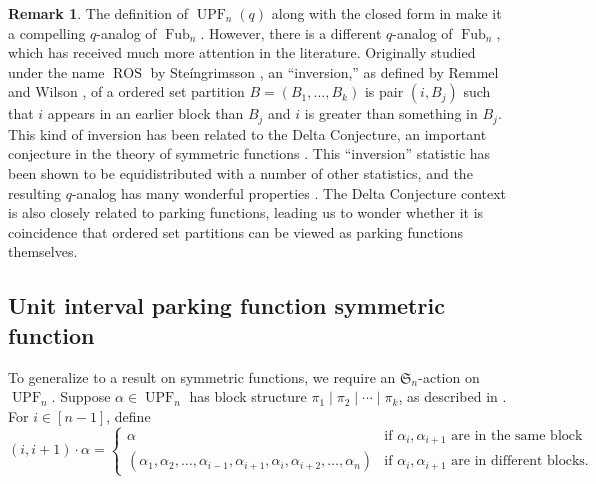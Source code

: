 \documentclass{amsart}
\renewcommand{\S}{\mathfrak{S}}
\DeclareMathOperator{\UPF}{UPF} %
\DeclareMathOperator{\Fub}{Fub}
\theoremstyle{definition}
\newtheorem{remark}[theorem]{Remark}
\begin{document}
\begin{remark}\label{remark:OSP-invs}
The definition of $\UPF_n(q)$ along with the closed form in   make it a compelling $q$-analog of $\Fub_n$. However, there is a different $q$-analog of $\Fub_n$, which has received much more attention in the literature. Originally studied under the name $\operatorname{ROS}$ by Ste\'ingrimsson \cite{OSPstats}, an ``inversion,'' as defined by Remmel and Wilson \cite{RemmelWilson}, of a ordered set partition $B=(B_1,\dots,B_k)$ is pair $(i,B_j)$ such that $i$ appears in an earlier block than $B_j$ and $i$ is greater than something in $B_j$. This kind of inversion has been related to the Delta Conjecture, an important conjecture in the theory of symmetric functions \cite{DeltaConjecture}. This ``inversion'' statistic has been shown to be equidistributed with a number of other statistics, and the resulting $q$-analog has many wonderful properties \cite{DeltaConjecture,Rhoades,ospcoinv}. The Delta Conjecture context is also closely related to parking functions, leading us to wonder whether it is coincidence that ordered set partitions can be viewed as parking functions themselves. \end{remark}

\subsection{Unit interval parking function symmetric function}\label{subsec:sym fct upf results}
To generalize to a result on symmetric functions, we require an $\S_n$-action on $\UPF_n$. Suppose $\alpha\in \UPF_n$ has block structure $\pi_1\mid\pi_2\mid \cdots\mid \pi_k$, as described in . 
For $i\in [n-1]$, define \[(i,i+1)\cdot \alpha=\begin{cases} \alpha&\text{if $\alpha_i,\alpha_{i+1}$ are in the same block}\\
(\alpha_1,\alpha_2,\dots,\alpha_{i-1},\alpha_{i+1},\alpha_i,\alpha_{i+2},\dots,\alpha_n)&\text{if $\alpha_i,\alpha_{i+1}$ are in different blocks.}
\end{cases}\]
\end{document}
